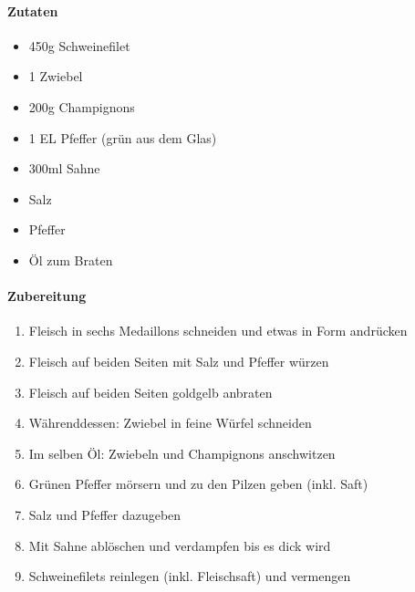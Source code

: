 \newpage
{}

\paragraph{Zutaten}
\begin{itemize}[noitemsep]
	\item 450g Schweinefilet
	\item 1 Zwiebel
	\item 200g Champignons
	\item 1 EL Pfeffer (grün aus dem Glas)
	\item 300ml Sahne
	\item Salz
	\item Pfeffer
	\item Öl zum Braten
\end{itemize}


\paragraph{Zubereitung}
\begin{enumerate}[noitemsep]
	\item Fleisch in sechs Medaillons schneiden und etwas in Form andrücken
	\item Fleisch auf beiden Seiten mit Salz und Pfeffer würzen
	\item Fleisch auf beiden Seiten goldgelb anbraten
	\item Währenddessen: Zwiebel in feine Würfel schneiden
	\item Im selben Öl: Zwiebeln und Champignons anschwitzen
	\item Grünen Pfeffer mörsern und zu den Pilzen geben (inkl. Saft)
	\item Salz und Pfeffer dazugeben
	\item Mit Sahne ablöschen und verdampfen bis es dick wird
	\item Schweinefilets reinlegen (inkl. Fleischsaft) und vermengen
\end{enumerate}